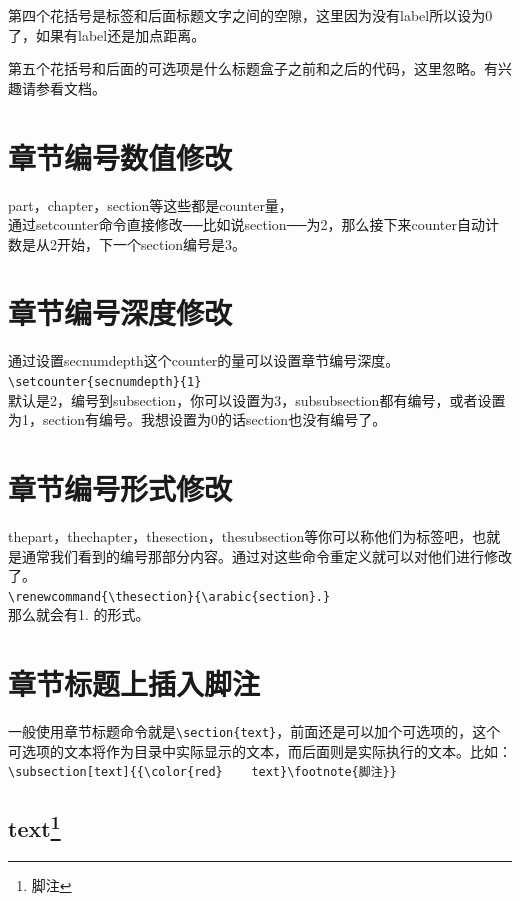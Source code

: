 \documentclass[11pt,oneside]{book}
\begin{document}
第四个花括号是标签和后面标题文字之间的空隙，这里因为没有label所以设为0了，如果有label还是加点距离。

第五个花括号和后面的可选项是什么标题盒子之前和之后的代码，这里忽略。有兴趣请参看文档。


\section{章节编号数值修改}
part，chapter，section等这些都是counter量，\\通过setcounter命令直接修改──比如说section──为2，那么接下来counter自动计数是从2开始，下一个section编号是3。

\section{章节编号深度修改}
通过设置secnumdepth这个counter的量可以设置章节编号深度。\\
\verb+\setcounter{secnumdepth}{1} +\\
默认是2，编号到subsection，你可以设置为3，subsubsection都有编号，或者设置为1，section有编号。我想设置为0的话section也没有编号了。

\section{章节编号形式修改}
\label{sec:章节编号形式修改}
thepart，thechapter，thesection，thesubsection等你可以称他们为标签吧，也就是通常我们看到的编号那部分内容。通过对这些命令重定义就可以对他们进行修改了。\\
\verb+\renewcommand{\thesection}{\arabic{section}.}+\\
那么就会有1. 的形式。

\section{章节标题上插入脚注}
一般使用章节标题命令就是\verb+\section{text}+，前面还是可以加个可选项的，这个可选项的文本将作为目录中实际显示的文本，而后面则是实际执行的文本。比如：\\
\verb+\subsection[text]{{\color{red}    text}\footnote{脚注}}+
\subsection[text]{{\color{red}    text}\footnote{脚注}}
\end{document}
